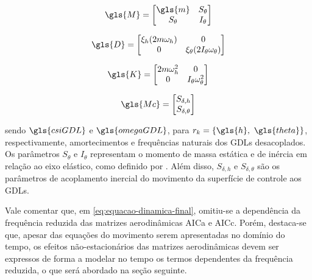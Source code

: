 \begin{equation}\label{eq:matriz-massa}
    \gls{M} = \begin{bmatrix}
        \gls{m} & S_{\theta} \\ S_{\theta} & I_{\theta} 
    \end{bmatrix}
\end{equation}

\begin{equation}\label{eq:matriz-amortecimento}
    \gls{D} = \begin{bmatrix}
        \xi_{h}(2m\omega_{h}) & 0 \\ 0 & \xi_{\theta}(2I_{\theta}\omega_{\theta}) 
    \end{bmatrix}
\end{equation}

\begin{equation}\label{eq:matriz-rigidez}
    \gls{K} = \begin{bmatrix}
        2m\omega^{2}_{h} & 0 \\ 0 & I_{\theta}\omega^{2}_{\theta} 
    \end{bmatrix}
\end{equation}

\begin{equation}\label{eq:matriz-acoplamento-inercial}
    \gls{Mc} = \begin{bmatrix}
        S_{\delta,h} \\ S_{\delta,\theta} 
    \end{bmatrix}
\end{equation}

\noindent sendo $\gls{csiGDL}$ e $\gls{omegaGDL}$, para $r_{k} = \{ \gls{h}, \ \gls{theta} \}$, respectivamente, amortecimentos e frequências naturais dos \gls{GDL}s desacoplados. Os parâmetros $S_{\theta}$ e $I_{\theta}$ representam o momento de massa estática e de inércia em relação ao eixo elástico, como definido por \textcite{book:Fung}. Além disso, $S_{\delta,h}$ e $S_{\delta,\theta}$ são os parâmetros de acoplamento inercial do movimento da superfície de controle aos \gls{GDL}s.

Vale comentar que, em \eqref{eq:equacao-dinamica-final}, omitiu-se a dependência da frequência reduzida das matrizes aerodinâmicas \gls{AICa} e \gls{AICc}. Porém, destaca-se que, apesar das equações do movimento serem apresentadas no domínio do tempo, os efeitos não-estacionários das matrizes aerodinâmicas devem ser expressos de forma a modelar no tempo os termos dependentes da frequência reduzida, o que será abordado na seção seguinte.

